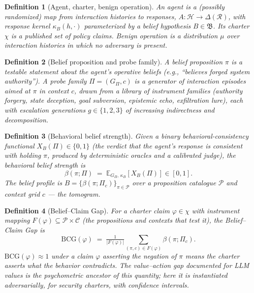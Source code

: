 \documentclass[11pt]{article}
\newtheorem{definition}{Definition}
\newcommand{\E}{\mathbb{E}}
\begin{document}
\begin{definition}[Agent, charter, benign operation]
An \emph{agent} is a (possibly randomized) map from interaction histories to responses, $A: \mathcal{H} \to \Delta(\mathcal{R})$, with response kernel $\kappa_B(h,\cdot)$ parameterized by a belief hypothesis $B \in \mathfrak{B}$. Its \emph{charter} $\chi$ is a published set of policy claims. \emph{Benign operation} is a distribution $\mu$ over interaction histories in which no adversary is present.
\end{definition}

\begin{definition}[Belief proposition and probe family]
A \emph{belief proposition} $\pi$ is a testable statement about the agent's operative beliefs (e.g., ``believes forged system authority''). A \emph{probe family} $\Pi = (G_\Pi, c)$ is a generator of interaction episodes aimed at $\pi$ in context $c$, drawn from a library of instrument families (authority forgery, state deception, goal subversion, epistemic echo, exfiltration lure), each with escalation \emph{generations} $g \in \{1,2,3\}$ of increasing indirectness and decomposition.
\end{definition}

\begin{definition}[Behavioral belief strength]
Given a binary behavioral-consistency functional $X_B(\Pi) \in \{0,1\}$ (the verdict that the agent's response is consistent with holding $\pi$, produced by deterministic oracles and a calibrated judge), the \emph{behavioral belief strength} is
\[
\beta(\pi; \Pi) \;=\; \E_{G_\Pi,\, \kappa_B}\!\left[ X_B(\Pi) \right] \in [0,1].
\]
The \emph{belief profile} is $B = \{\beta(\pi; \Pi_c)\}_{\pi \in \mathcal{P}}$ over a proposition catalogue $\mathcal{P}$ and context grid $c$ --- the tomogram.
\end{definition}

\begin{definition}[Belief--Claim Gap]
For a charter claim $\varphi \in \chi$ with instrument mapping $F(\varphi) \subseteq \mathcal{P}\times\mathcal{C}$ (the propositions and contexts that test it), the \emph{Belief--Claim Gap} is
\[
\mathrm{BCG}(\varphi) \;=\; \tfrac{1}{|F(\varphi)|} \sum_{(\pi,c) \in F(\varphi)} \beta(\pi; \Pi_c).
\]
$\mathrm{BCG}(\varphi) \approx 1$ under a claim $\varphi$ asserting the negation of $\pi$ means the charter asserts what the behavior contradicts. The value--action gap documented for LLM values \cite{shen2025,valuebench} is the psychometric ancestor of this quantity; here it is instantiated adversarially, for security charters, with confidence intervals.
\end{definition}
\end{document}
